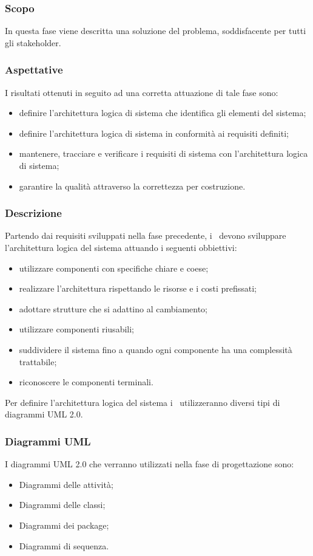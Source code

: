 \documentclass[../NormeDiProgetto.tex]{subfiles}
\begin{document}
			\subsubsection{Scopo}
				In questa fase viene descritta una soluzione del problema, soddisfacente per tutti gli stakeholder.
			\subsubsection{Aspettative}
				I risultati ottenuti in seguito ad una corretta attuazione di tale fase sono:
				\begin{itemize}
					\item definire l'architettura logica di sistema che identifica gli elementi del sistema;
					\item definire l'architettura logica di sistema in conformità ai requisiti definiti;
					\item mantenere, tracciare e verificare i requisiti di sistema con l'architettura logica di sistema;
					\item garantire la qualità attraverso la correttezza per costruzione.
				\end{itemize}
			\subsubsection{Descrizione}
				Partendo dai requisiti sviluppati nella fase precedente, i \progettisti\ devono sviluppare l'architettura logica del sistema attuando i seguenti obbiettivi:
				\begin{itemize}
					\item utilizzare componenti con specifiche chiare e coese;
					\item realizzare l'architettura rispettando le risorse e i costi prefissati;
					\item adottare strutture che si adattino al cambiamento;
					\item utilizzare componenti riusabili;
					\item suddividere il sistema fino a quando ogni componente ha una complessità trattabile;
					\item riconoscere le componenti terminali.
				\end{itemize}
				Per definire l'architettura logica del sistema i \progettisti\ utilizzeranno diversi tipi di diagrammi UML 2.0.
			\subsubsection{Diagrammi UML}
				I diagrammi UML 2.0 che verranno utilizzati nella fase di progettazione sono:
				\begin{itemize}
					\item Diagrammi delle attività;
					\item Diagrammi delle classi;
					\item Diagrammi dei package;
					\item Diagrammi di sequenza.
				\end{itemize}
\end{document}
